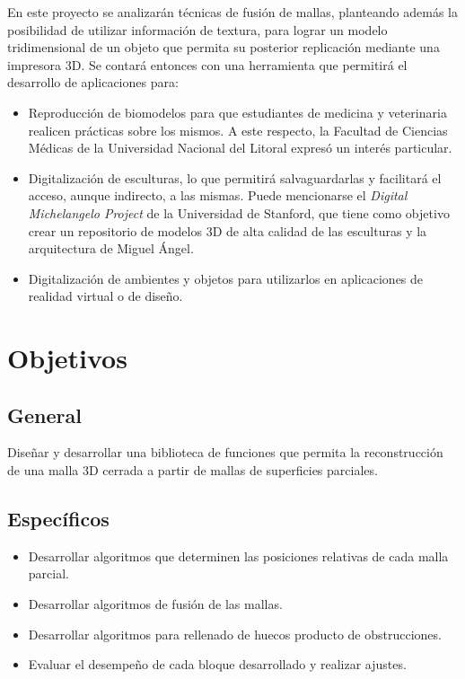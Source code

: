 	En este proyecto se analizarán técnicas de fusión de mallas,
	planteando además la posibilidad de utilizar información de textura,
	para lograr un modelo tridimensional de un objeto que permita su posterior replicación
	mediante una impresora 3D.
	Se contará entonces con una herramienta que permitirá el desarrollo de aplicaciones para:
	\begin{itemize}
		\item Reproducción de biomodelos para que estudiantes de medicina y veterinaria realicen prácticas sobre los mismos.
			A este respecto, la Facultad de Ciencias Médicas de la Universidad Nacional del Litoral expresó un interés particular.
		\item Digitalización de esculturas, lo que permitirá salvaguardarlas y facilitará el acceso, aunque indirecto, a las mismas.
			Puede mencionarse el \emph{Digital Michelangelo Project} de la Universidad de Stanford, que tiene como objetivo crear un repositorio de modelos 3D de alta calidad de las esculturas y la arquitectura de Miguel Ángel.
		\item Digitalización de ambientes y objetos para utilizarlos en aplicaciones de realidad virtual o de diseño.
	\end{itemize}

	\section{Objetivos}
		\subsection{General}
			Diseñar y desarrollar una biblioteca de funciones que permita
			la reconstrucción de una malla 3D cerrada a partir de mallas de superficies parciales.
		\subsection{Específicos}
		\begin{itemize}
			\item Desarrollar algoritmos que determinen las posiciones relativas de cada malla parcial.
			\item Desarrollar algoritmos de fusión de las mallas.
			\item Desarrollar algoritmos para rellenado de huecos producto de obstrucciones.
			\item Evaluar el desempeño de cada bloque desarrollado y realizar ajustes.
		\end{itemize}

